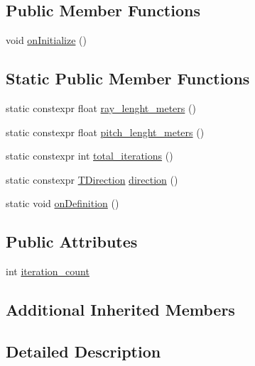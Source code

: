 \subsection*{Public Member Functions}
\begin{DoxyCompactItemize}
\item 
void \hyperlink{structsm__dance__bot_1_1SS4_1_1SsFPattern1_af69988c9481251c8e830779732db18cb}{on\+Initialize} ()
\end{DoxyCompactItemize}
\subsection*{Static Public Member Functions}
\begin{DoxyCompactItemize}
\item 
static constexpr float \hyperlink{structsm__dance__bot_1_1SS4_1_1SsFPattern1_ab6c84af47649dfe8cc5f2097ab01968b}{ray\+\_\+lenght\+\_\+meters} ()
\item 
static constexpr float \hyperlink{structsm__dance__bot_1_1SS4_1_1SsFPattern1_a603b30123514bdab9efbfc8c2069587c}{pitch\+\_\+lenght\+\_\+meters} ()
\item 
static constexpr int \hyperlink{structsm__dance__bot_1_1SS4_1_1SsFPattern1_a5c074a09438a374f3c8b268360936025}{total\+\_\+iterations} ()
\item 
static constexpr \hyperlink{namespacesm__dance__bot_1_1SS4_a8cc908c11b286e3f0591930361cc427e}{T\+Direction} \hyperlink{structsm__dance__bot_1_1SS4_1_1SsFPattern1_a4d286cea10dd7a14743a89f5a2131dc5}{direction} ()
\item 
static void \hyperlink{structsm__dance__bot_1_1SS4_1_1SsFPattern1_a29e23974126c002b96ecd1d3df40632c}{on\+Definition} ()
\end{DoxyCompactItemize}
\subsection*{Public Attributes}
\begin{DoxyCompactItemize}
\item 
int \hyperlink{structsm__dance__bot_1_1SS4_1_1SsFPattern1_abd668281596d2fc992d26eec97e69cb6}{iteration\+\_\+count}
\end{DoxyCompactItemize}
\subsection*{Additional Inherited Members}


\subsection{Detailed Description}


